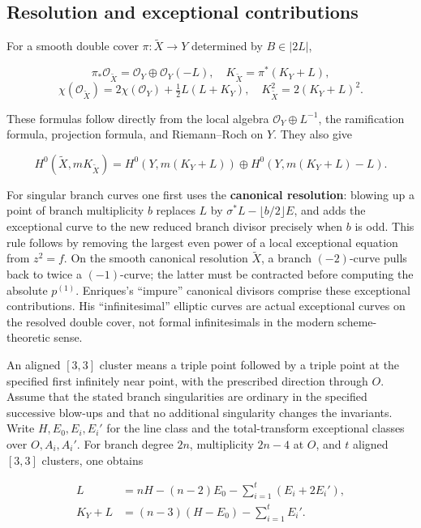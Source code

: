 \subsection{Resolution and exceptional contributions}

For a smooth double cover \(\pi:\widetilde X\to Y\) determined by \(B\in|2L|\),

\[
\pi_*\mathcal O_{\widetilde X}=\mathcal O_Y\oplus\mathcal O_Y(-L),\quad
K_{\widetilde X}=\pi^*(K_Y+L),
\] \[
\chi(\mathcal O_{\widetilde X})=2\chi(\mathcal O_Y)+\tfrac12L(L+K_Y),\quad
K_{\widetilde X}^2=2(K_Y+L)^2.
\tag{VI-DC}
\]

These formulas follow directly from the local algebra \(\mathcal O_Y\oplus L^{-1}\), the ramification formula, projection formula, and Riemann--Roch on \(Y\). They also give

\[
H^0(\widetilde X,mK_{\widetilde X})=H^0(Y,m(K_Y+L))
\oplus H^0(Y,m(K_Y+L)-L).
\]

For singular branch curves one first uses the \textbf{canonical resolution}: blowing up a point of branch multiplicity \(b\) replaces \(L\) by \(\sigma^*L-\lfloor b/2\rfloor E\), and adds the exceptional curve to the new reduced branch divisor precisely when \(b\) is odd. This rule follows by removing the largest even power of a local exceptional equation from \(z^2=f\). On the smooth canonical resolution \(\widetilde X\), a branch \((-2)\)-curve pulls back to twice a \((-1)\)-curve; the latter must be contracted before computing the absolute \(p^{(1)}\). Enriques's ``impure'' canonical divisors comprise these exceptional contributions. His ``infinitesimal'' elliptic curves are actual exceptional curves on the resolved double cover, not formal infinitesimals in the modern scheme-theoretic sense.

An aligned \([3,3]\) cluster means a triple point followed by a triple point at the specified first infinitely near point, with the prescribed direction through \(O\). Assume that the stated branch singularities are ordinary in the specified successive blow-ups and that no additional singularity changes the invariants. Write \(H,E_0,E_i,E_i'\) for the line class and the total-transform exceptional classes over \(O,A_i,A_i'\). For branch degree \(2n\), multiplicity \(2n-4\) at \(O\), and \(t\) aligned \([3,3]\) clusters, one obtains

\[
\begin{aligned}
L&=nH-(n-2)E_0-\sum_{i=1}^t(E_i+2E_i'),\\
K_Y+L&=(n-3)(H-E_0)-\sum_{i=1}^tE_i'.
\end{aligned}
\]

